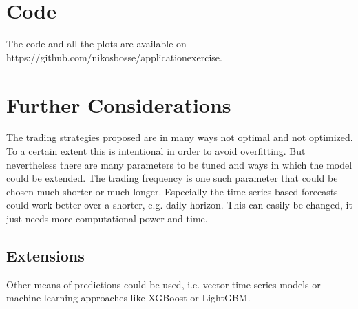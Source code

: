 \chapter{Code}
The code and all the plots are available on https://github.com/nikosbosse/applicationexercise.

\chapter{Further Considerations}
The trading strategies proposed are in many ways not optimal and not optimized. To a certain extent this is intentional in order to avoid overfitting. But nevertheless there are many parameters to be tuned and ways in which the model could be extended. The trading frequency is one such parameter that could be chosen much shorter or much longer. Especially the time-series based forecasts could work better over a shorter, e.g. daily horizon. This can easily be changed, it just needs more computational power and time. 

\section{Extensions}
Other means of predictions could be used, i.e. vector time series models or machine learning approaches like XGBoost or LightGBM. 
